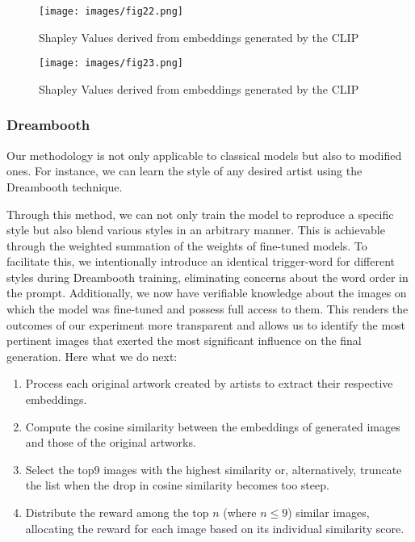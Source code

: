 \documentclass[12pt, letterpaper]{article}
\begin{document}
\begin{figure}[h]
    \centering
    \begin{minipage}{0.45\textwidth}
        \centering
        \texttt{[image: images/fig22.png]}
        \caption{Shapley Values derived from embeddings generated by the CLIP}
        \label{fig22:image1}
    \end{minipage}\hfill
    \begin{minipage}{0.45\textwidth}
        \centering
        \texttt{[image: images/fig23.png]}
        \caption{Shapley Values derived from embeddings generated by the CLIP}
        \label{fig23:image1}
    \end{minipage}
\end{figure}

\subsubsection{Dreambooth}

Our methodology is not only applicable to classical models but also to modified ones. For instance, we can learn the style of any desired artist using the Dreambooth technique.

Through this method, we can not only train the model to reproduce a specific style but also blend various styles in an arbitrary manner. This is achievable through the weighted summation of the weights of fine-tuned models. To facilitate this, we intentionally introduce an identical trigger-word for different styles during Dreambooth training, eliminating concerns about the word order in the prompt. Additionally, we now have verifiable knowledge about the images on which the model was fine-tuned and possess full access to them. This renders the outcomes of our experiment more transparent and allows us to identify the most pertinent images that exerted the most significant influence on the final generation. Here what we do next:
\begin{enumerate}[itemsep=0pt,topsep=5pt,partopsep=0pt]
    \item Process each original artwork created by artists to extract their respective embeddings.
    \item Compute the cosine similarity between the embeddings of generated images and those of the original artworks.
    \item Select the top9 images with the highest similarity or, alternatively, truncate the list when the drop in cosine similarity becomes too steep.
    \item Distribute the reward among the top \( n \) (where \( n \leq 9 \)) similar images, allocating the reward for each image based on its individual similarity score.
\end{enumerate}
\end{document}
